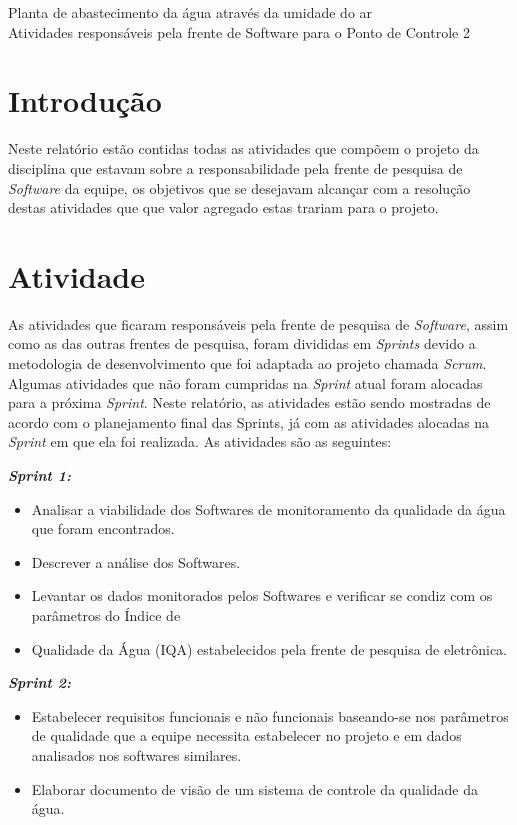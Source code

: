 \documentclass[12pt,openright,oneside,a4paper,brazil]{abntex2}
\begin{document}
\textual
\begin{center}
 {\large Planta de abastecimento da água através da umidade do ar}\\[0.2cm]
 {Atividades responsáveis pela frente de Software para o Ponto de Controle 2}\\
\end{center}
 
 \section*{Introdução}
 Neste relatório estão contidas todas as atividades que compõem o projeto da disciplina que estavam sobre a responsabilidade pela frente de pesquisa de \emph{Software} da equipe, os objetivos que se desejavam alcançar com a resolução destas atividades que que valor agregado estas trariam para o projeto.
 \section*{Atividade}
As atividades que ficaram responsáveis pela frente de pesquisa de \emph{Software}, assim como as das outras frentes de pesquisa, foram divididas em \emph{Sprints} devido a metodologia de desenvolvimento que foi adaptada ao projeto chamada \emph{Scrum}.
Algumas atividades que não foram cumpridas na \emph{Sprint} atual foram alocadas para a próxima \emph{Sprint}. Neste relatório, as atividades estão sendo mostradas de acordo com o planejamento final das Sprints, já com as atividades alocadas na \emph{Sprint} em que ela foi realizada.
As atividades são as seguintes:

\textbf{\emph{Sprint 1:}}
\begin{itemize}
\item Analisar a viabilidade dos Softwares de monitoramento da qualidade da água que foram encontrados.
\item Descrever a análise dos Softwares.
\item Levantar os dados monitorados pelos Softwares e verificar se condiz com os parâmetros do Índice de \item Qualidade da Água (IQA) estabelecidos pela frente de pesquisa de eletrônica.
\end{itemize}

\textbf{\emph{Sprint 2:}}
\begin{itemize}
\item Estabelecer requisitos funcionais e não funcionais baseando-se nos parâmetros de qualidade que a equipe necessita estabelecer no projeto e em dados analisados nos softwares similares.
\item Elaborar documento de visão de um sistema de controle da qualidade da água.
\end{itemize}
\end{document}

